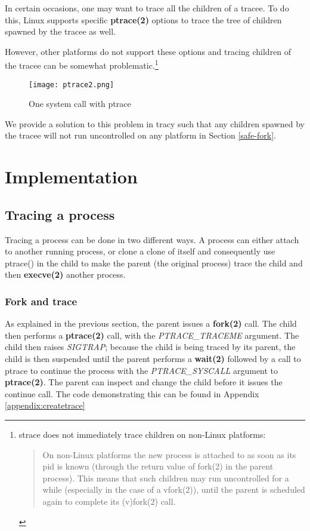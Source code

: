 \documentclass[a4paper, 10pt]{report}
\begin{document}
In certain occasions, one may want to trace all the children of a tracee.
To do this, Linux supports specific \textbf{ptrace(2)} options to trace
the tree of children spawned by the tracee as well.

However, other platforms do not support these options and tracing
children of the tracee can be somewhat problematic.\footnote{strace does not
immediately trace children on non-Linux platforms:
\begin{quote}
    On non-Linux platforms the new process is attached to as soon as its pid is
    known (through the return value of fork(2) in the parent process).
    This means that such children may run uncontrolled for a while
    (especially in the case of a vfork(2)), until the parent is scheduled
    again to complete its (v)fork(2)  call.
\end{quote}
}

\begin{figure}
\label{fig2}
\texttt{[image: ptrace2.png]}
\caption{One system call with ptrace}
\end{figure}

We provide a solution to this problem in tracy such that any children spawned
by the tracee will not run uncontrolled on any platform in Section \ref{safe-fork}.

\chapter{Implementation}

\section{Tracing a process}

Tracing a process can be done in two different ways. A process can either attach
to another running process, or clone a clone of itself and consequently  use
ptrace() in the child to make the parent (the original process) trace the child
and then \textbf{execve(2)} another process.

\subsection{Fork and trace}

As explained in the previous section, the parent issues a \textbf{fork(2)} call.
The child then performs a \textbf{ptrace(2)} call, with the
\textit{PTRACE\_TRACEME} argument. The child then raises \textit{SIGTRAP};
because the child is being traced by its parent, the child is then suspended
until the parent performs a \textbf{wait(2)} followed by a call to ptrace to
continue the process with the \textit{PTRACE\_SYSCALL} argument to
\textbf{ptrace(2)}. The parent can inspect and change the child before it issues
the continue call. The code demonstrating this can be found in
Appendix \ref{appendix:createtrace}
\end{document}
